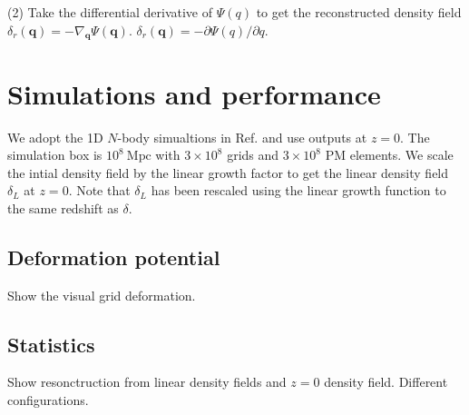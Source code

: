 \documentclass[aps,prd,twocolumn,showpacs,superscriptaddress,groupedaddress,nofootinbib]{revtex4}  %
\newcommand{\mr}{\mathrm}
\begin{document}
(2) Take the differential derivative of $\Psi(q)$ to get the reconstructed
density field $\delta_r(\bm{q})=-\nabla_{\bm{q}}\Psi(\bm{q})$.
$\delta_r(\bm{q})=-\partial\Psi(q)/\partial q$.


\section{Simulations and performance}

We adopt the 1D $N$-body simualtions in 
Ref. \cite{2016matt}
and use outputs at $z=0$. The simulation box is $10^8\ \mr{Mpc}$ with 
$3\times10^8$ grids and $3\times10^8$ PM elements.
We scale the intial density field by the linear
growth factor to get the linear density field $\delta_L$ at $z=0$. 
Note that $\delta_L$ has been rescaled using the linear growth function
to the same redshift as $\delta$. 

\subsection{Deformation potential}
Show the visual grid deformation.  

\subsection{Statistics}
Show resonctruction from linear density fields and $z=0$ density field.
Different configurations.

\end{document}
